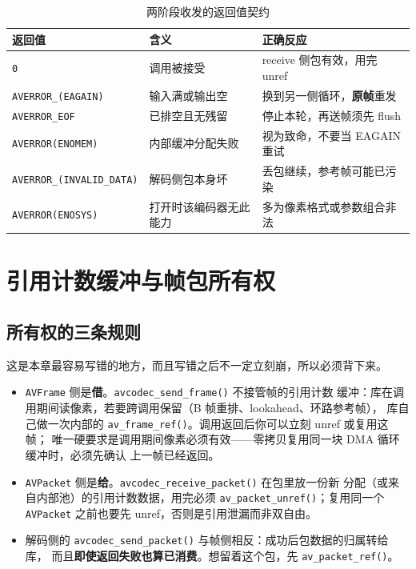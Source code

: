 \documentclass[12pt,a4paper,fontset=fandol]{ctexbook}
\newcommand{\Fn}[1]{\texttt{#1()}}
\newcommand{\Tp}[1]{\texttt{#1}}
\newcommand{\Bk}{\discretionary{}{}{}}
\begin{document}
\begin{longtable}{@{}>{\raggedright\arraybackslash\footnotesize}p{} >{\raggedright\arraybackslash\footnotesize}p{} >{\raggedright\arraybackslash\footnotesize}p{}@{}}
\caption{两阶段收发的返回值契约}\label{tab:ch06-ret} \\
\toprule
返回值 & 含义 & 正确反应 \\
\midrule
\endfirsthead
\Tp{0} & 调用被接受 & receive 侧包有效，用完 unref \\
\Tp{AVERROR\Bk\_(EAGAIN)} & 输入满或输出空 & 换到另一侧循环，\textbf{原帧}重发 \\
\Tp{AVERROR\_EOF} & 已排空且无残留 & 停止本轮，再送帧须先 flush \\
\Tp{AVERROR(ENOMEM)} & 内部缓冲分配失败 & 视为致命，不要当 EAGAIN 重试 \\
\Tp{AVERROR\Bk\_(INVALID\Bk\_DATA)} & 解码侧包本身坏 & 丢包继续，参考帧可能已污染 \\
\Tp{AVERROR(ENOSYS)} & 打开时该编码器无此能力 & 多为像素格式或参数组合非法 \\
\bottomrule
\end{longtable}

\section{引用计数缓冲与帧包所有权}

\subsection{所有权的三条规则}

这是本章最容易写错的地方，而且写错之后不一定立刻崩，所以必须背下来。

\begin{itemize}
\item \Tp{AVFrame} 侧是\textbf{借}。\Fn{avcodec\_send\_frame} 不接管帧的引用计数
  缓冲：库在调用期间读像素，若要跨调用保留（B 帧重排、lookahead、环路参考帧），
  库自己做一次内部的 \Fn{av\_frame\_ref}。调用返回后你可以立刻 unref 或复用这帧；
  唯一硬要求是调用期间像素必须有效——零拷贝复用同一块 DMA 循环缓冲时，必须先确认
  上一帧已经返回。
\item \Tp{AVPacket} 侧是\textbf{给}。\Fn{avcodec\_receive\_packet} 在包里放一份新
  分配（或来自内部池）的引用计数数据，用完必须 \Fn{av\_packet\_unref}；复用同一个
  \Tp{AVPacket} 之前也要先 unref，否则是引用泄漏而非双自由。
\item 解码侧的 \Fn{avcodec\_send\_packet} 与帧侧相反：成功后包数据的归属转给库，
  而且\textbf{即使返回失败也算已消费}。想留着这个包，先 \Fn{av\_packet\_ref}。
\end{itemize}
\end{document}
